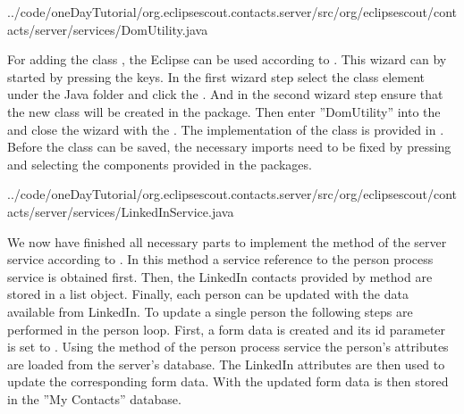 \documentclass[a4paper,10pt,twoside]{book}
\begin{document}

{../code/oneDayTutorial/org.eclipsescout.contacts.server/src/org/eclipsescout/contacts/server/services/DomUtility.java}

For adding the class , the Eclipse  can be used according to . 
This wizard can by started by pressing the  keys. 
In the first wizard step select the class element under the Java folder and click the .
And in the second wizard step ensure that the new class will be created in the  package.
Then enter ''DomUtility'' into the  and close the wizard with the . 
The implementation of the class is provided in . 
Before the class can be saved, the necessary imports need to be fixed by pressing  and selecting the components provided in the  packages.


{../code/oneDayTutorial/org.eclipsescout.contacts.server/src/org/eclipsescout/contacts/server/services/LinkedInService.java}

We now have finished all necessary parts to implement the method  of the server service  according to . 
In this method a service reference to the person process service is obtained first. 
Then, the LinkedIn contacts provided by method  are stored in a  list object. 
Finally, each person can be updated with the data available from LinkedIn.
To update a  single person the following steps are performed in the person loop. 
First, a form data is created and its id parameter is set to . 
Using the  method of the person process service the person's attributes are loaded from the server's database. 
The LinkedIn attributes are then used to update the corresponding form data. 
With  the updated form data is then stored in the ''My Contacts'' database. 
\end{document}
